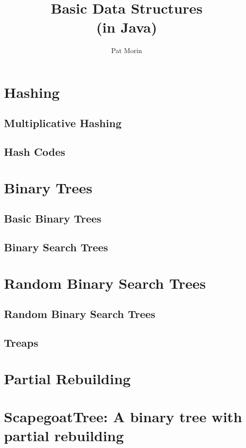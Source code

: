 \documentclass{book}
\title{Basic Data Structures\\(in Java)}
\author{Pat Morin}
\begin{document}
\begin{titlepage}
\maketitle
\thispagestyle{empty}
\end{titlepage}

\tableofcontents






\chapter{Hashing}
\section{Multiplicative Hashing}
\section{Hash Codes}

\chapter{Binary Trees}
\section{Basic Binary Trees}
\section{Binary Search Trees}

\chapter{Random Binary Search Trees}
\section{Random Binary Search Trees}
\section{Treaps}

\chapter{Partial Rebuilding}
\chapter{ScapegoatTree: A binary tree with partial rebuilding}
\end{document}

